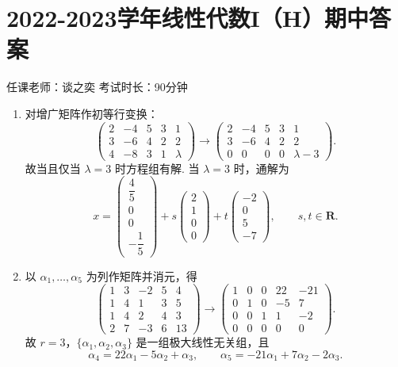 \section{2022-2023学年线性代数I（H）期中答案}

\begin{center}
    任课老师：谈之奕\hspace{4em} 考试时长：90分钟
\end{center}
\begin{enumerate}
    \item 对增广矩阵作初等行变换：
    \[
        \begin{pmatrix}
            2&-4&5&3&1\\
            3&-6&4&2&2\\
            4&-8&3&1&\lambda
        \end{pmatrix}
        \longrightarrow
        \begin{pmatrix}
            2&-4&5&3&1\\
            3&-6&4&2&2\\
            0&0&0&0&\lambda-3
        \end{pmatrix}.
    \]
    故当且仅当 $\lambda=3$ 时方程组有解. 当 $\lambda=3$ 时，通解为
    \[
        x=\begin{pmatrix}\dfrac45\\[4pt]0\\[4pt]0\\[4pt]-\dfrac15\end{pmatrix}
        +s\begin{pmatrix}2\\1\\0\\0\end{pmatrix}
        +t\begin{pmatrix}-2\\0\\5\\-7\end{pmatrix},
        \qquad s,t\in\mathbf{R}.
    \]

    \item 以 $\alpha_1,\ldots,\alpha_5$ 为列作矩阵并消元，得
    \[
        \begin{pmatrix}
            1&3&-2&5&4\\
            1&4&1&3&5\\
            1&4&2&4&3\\
            2&7&-3&6&13
        \end{pmatrix}
        \longrightarrow
        \begin{pmatrix}
            1&0&0&22&-21\\
            0&1&0&-5&7\\
            0&0&1&1&-2\\
            0&0&0&0&0
        \end{pmatrix}.
    \]
    故 $r=3$，$\{\alpha_1,\alpha_2,\alpha_3\}$ 是一组极大线性无关组，且
    \[
        \alpha_4=22\alpha_1-5\alpha_2+\alpha_3,\qquad
        \alpha_5=-21\alpha_1+7\alpha_2-2\alpha_3.
    \]


\end{enumerate}
